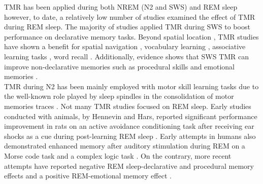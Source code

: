 TMR has been applied during both NREM (N2 and SWS) and REM sleep however, to date, a relatively low number of studies examined the effect of TMR during REM sleep. The majority of studies applied TMR during SWS to boost performance on declarative memory tasks. Beyond spatial location \parencite{diekelmann_labile_2011,diekelmann_offline_2012,rasch_odor_2007,rudoy_strengthening_2009}, TMR studies have shown a benefit for spatial navigation \parencite{shimizu_closed-loop_2018}, vocabulary learning \parencite{schreiner_boosting_2015}, associative learning tasks \parencite{cairney_mechanisms_2017,cairney_memory_2018}, word recall \parencite{fuentemilla_hippocampus-dependent_2013}. Additionally, evidence shows that SWS TMR can improve non-declarative memories such as procedural skills \parencite{antony_cued_2013,cousins_cued_2014,cousins_cued_2016,schonauer_strengthening_2013} and emotional memories \parencite{cairney_targeted_2014,lehmann_emotional_2016,hu_promoting_2020}.\\
TMR during N2 has been mainly employed with motor skill learning tasks \parencite{laventure_nrem2_2016,laventure_beyond_2018} due to the well-known role played by sleep spindles in the consolidation of motor memories traces \parencite{fogel_function_2011,morin_motor_2008}. 
Not many TMR studies focused on REM sleep. Early studies conducted with animals, by Hennevin and Hars, reported significant performance improvement in rats on an active avoidance conditioning task after receiving ear shocks as a cue during post-learning REM sleep \parencite{hars_improvement_1985,hennevin_is_1987}. Early attempts in humans also demonstrated enhanced memory after auditory stimulation during REM on a Morse code task \parencite{guerrien_enhancement_1989} and a complex logic task \parencite{smith_post_1990}. On the contrary, more recent attempts have reported negative REM sleep-declarative and procedural memory effects \parencite{laventure_nrem2_2016,rasch_odor_2007} and a positive REM-emotional memory effect \parencite{hutchison_targeted_2021,schwartz_enhancing_2022,wassing_restless_2019}.\\
